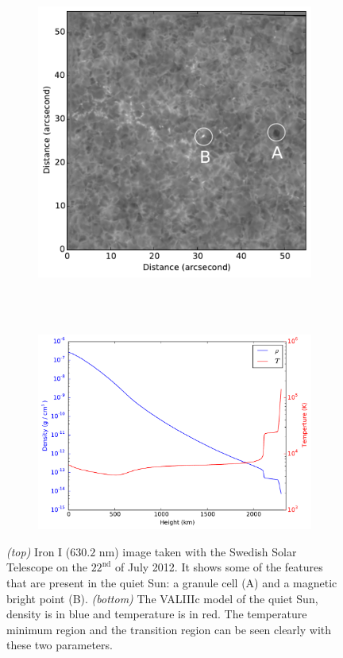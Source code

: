     \begin{figure}    
        \centering
        \begin{subfigure}[b]{0.75\textwidth}
            \includegraphics[width=\textwidth]{QS.pdf}
        \end{subfigure}\\~\\
        \begin{subfigure}[b]{0.75\textwidth}
            \includegraphics[width=\textwidth]{val3.pdf}
        \end{subfigure}
        \caption{
                \textit{(top)} Iron I ($630.2$ nm) image taken with the Swedish Solar Telescope on the $22^{\mathrm{nd}}$ of July 2012.
                It shows some of the features that are present in the quiet Sun: a granule cell (A) and a magnetic bright point (B).
                \textit{(bottom)} The VALIIIc \citep{1981ApJS...45..635V} model of the quiet Sun, density is in blue and temperature is in red.
                The temperature minimum region and the transition region can be seen clearly with these two parameters.
                }
        \label{fig:photosphere}        
    \end{figure}   
    
